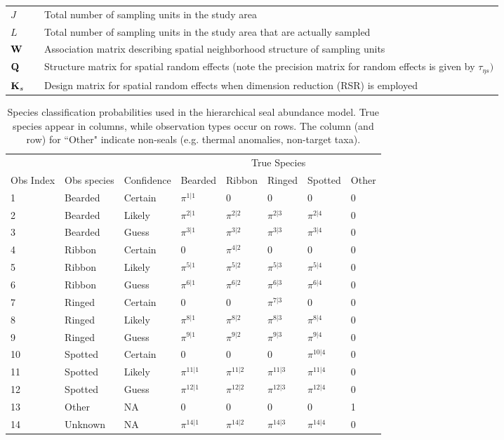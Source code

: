 \documentclass[12pt,fleqn]{article}
\begin{document}
\begin{flushleft}
\begin{longtable}{p{1.5cm}l p{14cm}}
$J$  & & Total number of sampling units in the study area \\
$L$  & & Total number of sampling units in the study area that are actually sampled\\
${\bf W}$ & & Association matrix describing spatial neighborhood structure of sampling units\\
${\bf Q} $  & & Structure matrix for spatial random effects (note the precision matrix for
  random effects is given by $\tau_{\eta s})$\\
${\bf K}_s $  & & Design matrix for spatial random effects when dimension reduction (RSR) is employed\\
\hline
\end{longtable}

\pagebreak

\begin{table}
\caption{Species classification probabilities used in the hierarchical seal abundance model.  True species
appear in columns, while observation types occur on rows.  The column (and row) for ``Other" indicate
non-seals (e.g. thermal anomalies, non-target taxa).}
\begin{tabular}{llllllll}
\hline
& & & \multicolumn{5}{c}{True Species} \\ \cline{4-8}
Obs Index & Obs species & Confidence & Bearded & Ribbon & Ringed & Spotted & Other \\
1 & Bearded & Certain & $\pi^{1|1}$ & 0 & 0 & 0 & 0 \\
2 & Bearded & Likely &  $\pi^{2|1}$ & $\pi^{2|2}$ & $\pi^{2|3}$ & $\pi^{2|4}$ & 0 \\
3 & Bearded & Guess &  $\pi^{3|1}$ & $\pi^{3|2}$ & $\pi^{3|3}$ & $\pi^{3|4}$ & 0 \\
4 & Ribbon & Certain & 0 & $\pi^{4|2}$ & 0 & 0 & 0 \\
5 & Ribbon & Likely & $\pi^{5|1}$ & $\pi^{5|2}$ & $\pi^{5|3}$ & $\pi^{5|4}$ & 0 \\
6 & Ribbon & Guess & $\pi^{6|1}$ & $\pi^{6|2}$ & $\pi^{6|3}$ & $\pi^{6|4}$ & 0 \\
7 & Ringed & Certain & 0 & 0 & $\pi^{7|3}$ & 0 & 0 \\
8 & Ringed & Likely & $\pi^{8|1}$ & $\pi^{8|2}$ & $\pi^{8|3}$ & $\pi^{8|4}$ & 0 \\
9 & Ringed & Guess & $\pi^{9|1}$ & $\pi^{9|2}$ & $\pi^{9|3}$ & $\pi^{9|4}$ & 0 \\
10 & Spotted & Certain & 0 & 0 & 0 & $\pi^{10|4}$ & 0 \\
11 & Spotted & Likely & $\pi^{11|1}$ & $\pi^{11|2}$ & $\pi^{11|3}$ & $\pi^{11|4}$ & 0 \\
12 & Spotted & Guess & $\pi^{12|1}$ & $\pi^{12|2}$ & $\pi^{12|3}$ & $\pi^{12|4}$ & 0 \\
13 & Other & NA & 0 & 0 & 0 & 0 & 1 \\
14 & Unknown & NA & $\pi^{14|1}$ & $\pi^{14|2}$ & $\pi^{14|3}$ & $\pi^{14|4}$ & 0 \\
\hline
\end{tabular}
\vspace{2cm}
\label{tab:confuse}
\end{table}



\end{flushleft}
\end{document}
